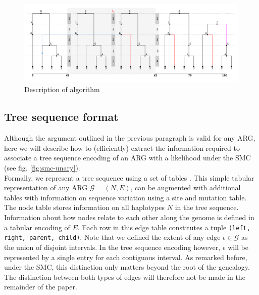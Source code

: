 \documentclass{article}
\begin{document}
\begin{figure}[h!] \label{fig:algo-flat}
\centering
\includegraphics[width=\textwidth]{figures/smc_algo_flat.png}
\caption{Description of algorithm}
\end{figure}


\subsection{Tree sequence format} \label{par:algo}

Although the argument outlined in the previous paragraph is valid for any ARG, here we 
will describe how to (efficiently) extract the information required to associate a
tree sequence encoding of an ARG with a likelihood under the SMC (see fig. \ref{fig:smc-unary}).\\

Formally, we represent a tree sequence using a set of tables \citep{kelleher_efficient_2018}. 
This simple tabular representation of any ARG $\mathcal{G} = (N, E)$, can be 
augmented with additional tables with information on sequence variation
using a site and mutation table. The node table stores information on all 
haplotypes $N$ in the tree sequence. Information about how nodes relate to 
each other along the genome is defined in a tabular encoding of $E$.
Each row in this edge table constitutes a tuple \texttt{(left, right, parent, child)}.
Note that we defined the extent of any edge $\epsilon \in \mathcal{G}$ as the union of 
disjoint intervals. In the tree sequence encoding however, $\epsilon$ will be represented 
by a single entry for each contiguous interval. As remarked before, under the SMC, this 
distinction only matters beyond the root of the genealogy. The distinction between both 
types of edges will therefore not be made in the remainder of the paper.
\\
\end{document}
